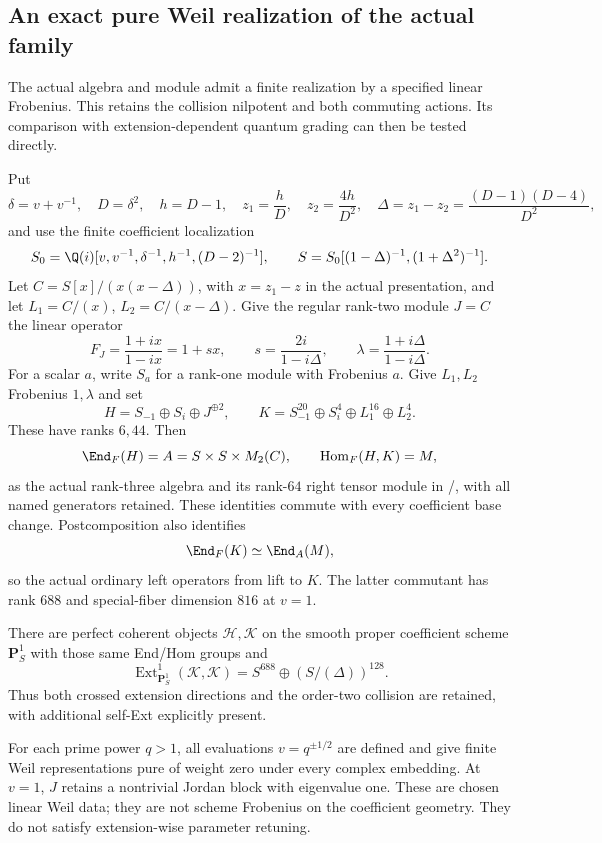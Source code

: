 \subsection{An exact pure Weil realization of the actual family}
The actual algebra and module admit a finite realization by a
specified linear Frobenius. This retains the collision nilpotent
and both commuting actions. Its comparison with extension-dependent
quantum grading can then be tested directly.

\begin{finding}\label{f:cayleyweil}
Put
\[
 \delta=v+v^{-1},\quad D=\delta^2,\quad h=D-1,\quad
 z_1=\frac hD,\quad z_2=\frac{4h}{D^2},\quad
 \Delta=z_1-z_2=\frac{(D-1)(D-4)}{D^2},
\]
and use the finite coefficient localization
\[
 S_0=\Q(i)[v,v^{-1},\delta^{-1},h^{-1},(D-2)^{-1}],
 \qquad S=S_0[(1-\Delta)^{-1},(1+\Delta^2)^{-1}].
\]
Let $C=S[x]/(x(x-\Delta))$, with $x=z_1-z$ in the actual
presentation, and let $L_1=C/(x)$, $L_2=C/(x-\Delta)$.
Give the regular rank-two module $J=C$ the linear operator
\[
 F_J=\frac{1+ix}{1-ix}=1+s x,\qquad
 s=\frac{2i}{1-i\Delta},\qquad
 \lambda=\frac{1+i\Delta}{1-i\Delta}.
\]
For a scalar $a$, write $S_a$ for a rank-one module with
Frobenius $a$. Give $L_1,L_2$ Frobenius $1,\lambda$ and set
\[
 H=S_{-1}\oplus S_i\oplus J^{\oplus2},\qquad
 K=S_{-1}^{20}\oplus S_i^4\oplus L_1^{16}\oplus L_2^4.
\]
These have ranks $6,44$. Then
\[
 \End_F(H)=A=S\times S\times M_2(C),\qquad
 \operatorname{Hom}_F(H,K)=M,
\]
as the actual rank-three algebra and its rank-$64$ right tensor
module in /, with all named generators retained.
These identities commute with every coefficient base change.
Postcomposition also identifies
\[
 \End_F(K)\simeq\End_A(M),
\]
so the actual ordinary left operators from  lift to $K$.
The latter commutant has rank $688$ and special-fiber dimension
$816$ at $v=1$.

There are perfect coherent objects $\mathscr H,\mathscr K$ on
the smooth proper coefficient scheme $\mathbf P^1_S$ with those
same End/Hom groups and
\[
 \operatorname{Ext}^1_{\mathbf P^1_S}(\mathscr K,\mathscr K)
       =S^{688}\oplus(S/(\Delta))^{128}.
\]
Thus both crossed extension directions and the order-two collision
are retained, with additional self-Ext explicitly present.

For each prime power $q>1$, all evaluations $v=q^{\pm1/2}$ are
defined and give finite Weil representations pure of weight zero
under every complex embedding. At $v=1$, $J$ retains a nontrivial
Jordan block with eigenvalue one. These are chosen linear Weil
data; they are not scheme Frobenius on the coefficient geometry.
They do not satisfy extension-wise parameter retuning.
\end{finding}

